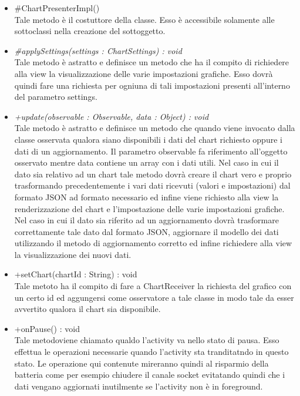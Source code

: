 \begin{itemize}
\begin{itemize}
					\item[\ding{111}] {{\#ChartPresenterImpl()}} \\ [1mm] Tale metodo è il costuttore della classe. Esso è accessibile solamente alle sottoclassi nella creazione del sottoggetto.
					\item[\ding{111}] \textit{{\#applySettings(settings : ChartSettings) : void}} \\ [1mm] Tale metodo è astratto e definisce un metodo che ha il compito di richiedere alla view la visualizzazione delle varie impostazioni grafiche. Esso dovrà quindi fare una richiesta per ogniuna di tali impostazioni presenti all'interno del parametro settings.
					\item[\ding{111}] \textit{{+update(observable : Observable, data : Object) : void}} \\ [1mm] Tale metodo è astratto e definisce un metodo che quando viene invocato dalla classe osservata qualora siano disponibili i dati del chart richiesto oppure i dati di un aggiornamento. Il parametro observable fa riferimento all'oggetto osservato mentre data contiene un array con i dati utili. Nel caso in cui il dato sia relativo ad un chart tale metodo dovrà creare il chart vero e proprio trasformando precedentemente i vari dati ricevuti (valori e impostazioni) dal formato JSON ad formato necessario ed infine viene richiesto alla view la renderizzazione del chart e l'impostazione delle varie impostazioni grafiche. Nel caso in cui il dato sia riferito ad un aggiornamento dovrà trasformare correttamente tale dato dal formato JSON, aggiornare il modello dei dati utilizzando il metodo di aggiornamento corretto ed infine richiedere alla view la visualizzazione dei nuovi dati.
					\item[\ding{111}] {{+setChart(chartId : String) : void}} \\ [1mm] Tale metoto ha il compito di fare a ChartReceiver la richiesta del grafico con un certo id ed aggungersi come osservatore a tale classe in modo tale da esser avvertito qualora il chart sia disponibile.
					\item[\ding{111}] {{+onPause() : void}} \\ [1mm] Tale metodoviene chiamato qualdo l'activity va nello stato di pausa. Esso effettua le operazioni necessarie quando l'activity sta tranditatndo in questo stato. Le operazione qui contenute mireranno quindi al risparmio della batteria come per esempio chiudere il canale socket evitatando quindi che i dati vengano aggiornati inutilmente se l'activity non è in foreground.
				\end{itemize}
		
			\end{itemize}

